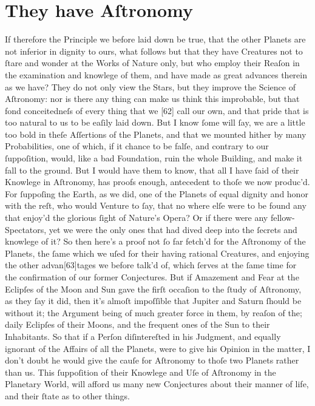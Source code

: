 \documentclass[letterpaper]{book}
\begin{document}
\section{They have Aſtronomy}

If therefore the Principle we before laid down be true, that the other
Planets are not inferior in dignity to ours, what follows but that they have
Creatures not to ſtare and wonder at the Works of Nature only, but who
employ their Reaſon in the examination and knowlege of them, and have made
as great advances therein as we have? They do not only view the Stars, but
they improve the Science of Aſtronomy: nor is there any thing can make us
think this improbable, but that fond conceitedneſs of every thing that we
[62] call our own, and that pride that is too natural to us to be eaſily
laid down. But I know ſome will ſay, we are a little too bold in theſe
Aſſertions of the Planets, and that we mounted hither by many Probabilities,
one of which, if it chance to be falſe, and contrary to our ſuppoſition,
would, like a bad Foundation, ruin the whole Building, and make it fall to
the ground.  But I would have them to know, that all I have ſaid of their
Knowlege in Aſtronomy, has proofs enough, antecedent to thoſe we now
produc'd. For ſuppoſing the Earth, as we did, one of the Planets of equal
dignity and honor with the reſt, who would Venture to ſay, that no where
elſe were to be found any that enjoy'd the glorious ſight of Nature's Opera?
Or if there were any fellow-Spectators, yet we were the only ones that had
dived deep into the ſecrets and knowlege of it? So then here's a proof not
ſo far fetch'd for the Aſtronomy of the Planets, the ſame which we uſed for
their having rational Creatures, and enjoying the other advan[63]tages we
before talk'd of, which ſerves at the ſame time for the confirmation of our
former Conjectures. But if Amazement and Fear at the Eclipſes of the Moon
and Sun gave the firſt occaſion to the ſtudy of Aſtronomy, as they ſay it
did, then it's almoſt impoſſible that Jupiter and Saturn ſhould be without
it; the Argument being of much greater force in them, by reaſon of the;
daily Eclipſes of their Moons, and the frequent ones of the Sun to their
Inhabitants. So that if a Perſon diſintereſted in his Judgment, and equally
ignorant of the Affairs of all the Planets, were to give his Opinion in the
matter, I don't doubt he would give the cauſe for Aſtronomy to thoſe two
Planets rather than us.  This ſuppoſition of their Knowlege and Uſe of
Aſtronomy in the Planetary World, will afford us many new Conjectures
about their manner of life, and their ſtate as to other things.
\end{document}
